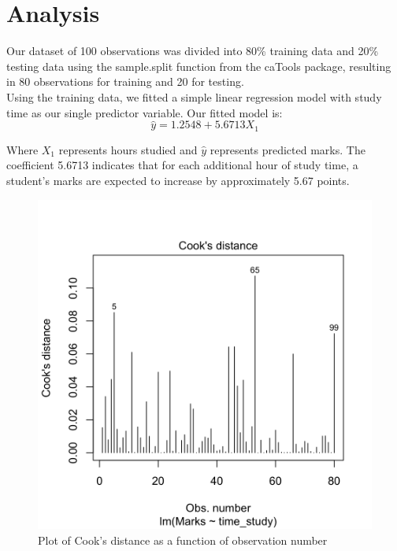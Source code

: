 \documentclass{article}
\begin{document}
\section{Analysis}

Our dataset of 100 observations was divided into 80\% training data and 20\% testing data using the sample.split function from the caTools package, resulting in 80 observations for training and 20 for testing.\\

\noindent Using the training data, we fitted a simple linear regression model with study time as our single predictor variable. Our fitted model is:
\begin{equation} \hat{y} = 1.2548 + 5.6713X_1 \end{equation}

\noindent Where $X_1$ represents hours studied and $\hat{y}$ represents predicted marks. The coefficient 5.6713 indicates that for each additional hour of study time, a student's marks are expected to increase by approximately 5.67 points.

\begin{figure}[h]
\centering
    \includegraphics[scale=0.3]{imgs/Cook_Distance.png}    
    \caption{Plot of Cook's distance as a function of observation number}
    \label{fig:cook}
\end{figure}
\end{document}
